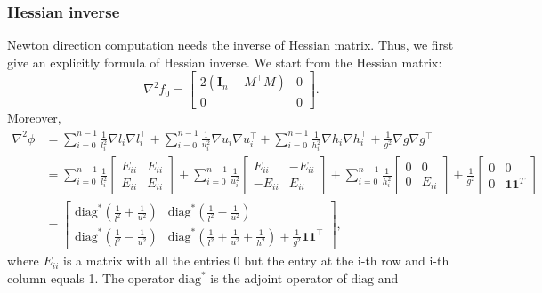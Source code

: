 \documentclass[final,onefignum,onetabnum]{siamart190516}
\begin{document}
\subsubsection{Hessian inverse}
Newton direction computation needs the inverse of Hessian matrix. Thus, we first give an explicitly formula of Hessian inverse. We start from the Hessian matrix:
\begin{equation}
    \nabla^2 f_0 = \begin{bmatrix} 2(\mathbf{I}_n-M^\top M) &0\\0 &0\end{bmatrix}.
\end{equation}
Moreover,
\begin{equation}
\begin{aligned}
    \nabla^2 \phi &= \sum_{i=0}^{n-1}
\frac{1}{l_i^2}\nabla l_i\nabla l_i^\top + \sum_{i=0}^{n-1}
\frac{1}{u_i^2}\nabla u_i\nabla u_i^\top + \sum_{i=0}^{n-1}
\frac{1}{h_i^2}\nabla h_i\nabla h_i^\top + \frac{1}{g^2} \nabla g\nabla g^\top\\
&= \sum_{i=0}^{n-1}
\frac{1}{l_i^2}\begin{bmatrix} E_{ii} & E_{ii}\\ E_{ii} &E_{ii}\end{bmatrix} + \sum_{i=0}^{n-1}
\frac{1}{u_i^2}\begin{bmatrix} E_{ii} & -E_{ii}\\ -E_{ii} &E_{ii}\end{bmatrix} + \sum_{i=0}^{n-1}
\frac{1}{h_i^2}\begin{bmatrix} 0 & 0\\ 0 &E_{ii}\end{bmatrix} + \frac{1}{g^2} \begin{bmatrix} 0 & 0\\ 0 &\mathbf{1}\mathbf{1}^T\end{bmatrix}\\
&=\begin{bmatrix} \text{diag}^*(\frac{1}{l^2}+\frac{1}{u^2}) &  \text{diag}^*(\frac{1}{l^2}-\frac{1}{u^2})\\
\text{diag}^*(\frac{1}{l^2}-\frac{1}{u^2}) & \text{diag}^*(\frac{1}{l^2}+\frac{1}{u^2}+\frac{1}{h^2}) + \frac{1}{g^2}\mathbf{1}\mathbf{1}^\top\end{bmatrix},
\end{aligned}
\end{equation}
where $E_{ii}$ is a matrix with all the entries 0 but the entry at the i-th row and i-th column equals 1. The operator $\text{diag}^*$ is the adjoint operator of $\text{diag}$ and
\end{document}
